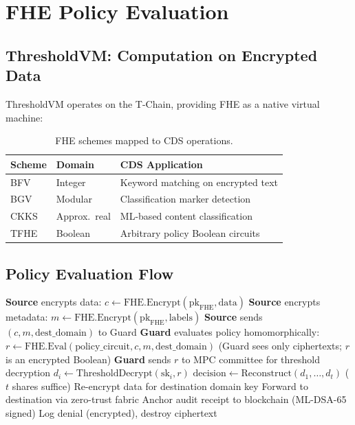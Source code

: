 \documentclass[11pt,letterpaper]{article}
\begin{document}
\section{FHE Policy Evaluation}

\subsection{ThresholdVM: Computation on Encrypted Data}

ThresholdVM operates on the T-Chain, providing FHE as a native virtual machine:

\begin{table}[H]
\centering
\begin{tabular}{@{}llp{4.5cm}@{}}
\toprule
\textbf{Scheme} & \textbf{Domain} & \textbf{CDS Application} \\
\midrule
BFV & Integer & Keyword matching on encrypted text \\
BGV & Modular & Classification marker detection \\
CKKS & Approx.\ real & ML-based content classification \\
TFHE & Boolean & Arbitrary policy Boolean circuits \\
\bottomrule
\end{tabular}
\caption{FHE schemes mapped to CDS operations.}
\label{tab:fhe-cds}
\end{table}

\subsection{Policy Evaluation Flow}

\begin{algorithm}[H]
\caption{FHE Cross-Domain Policy Evaluation}
\begin{algorithmic}[1]
\State \textbf{Source} encrypts data: $c \gets \text{FHE.Encrypt}(\text{pk}_{\text{FHE}}, \text{data})$
\State \textbf{Source} encrypts metadata: $m \gets \text{FHE.Encrypt}(\text{pk}_{\text{FHE}}, \text{labels})$
\State \textbf{Source} sends $(c, m, \text{dest\_domain})$ to Guard
\Statex
\State \textbf{Guard} evaluates policy homomorphically:
\State \quad $r \gets \text{FHE.Eval}(\text{policy\_circuit}, c, m, \text{dest\_domain})$
\State \quad (Guard sees only ciphertexts; $r$ is an encrypted Boolean)
\Statex
\State \textbf{Guard} sends $r$ to MPC committee for threshold decryption
  \State $d_i \gets \text{ThresholdDecrypt}(\text{sk}_i, r)$
\EndFor
\State $\text{decision} \gets \text{Reconstruct}(d_1, \ldots, d_t)$ \quad ($t$ shares suffice)
\Statex
{}
  \State Re-encrypt data for destination domain key
  \State Forward to destination via zero-trust fabric
  \State Anchor audit receipt to blockchain (ML-DSA-65 signed)
\Else
  \State Log denial (encrypted), destroy ciphertext
\EndIf
\end{algorithmic}
\end{algorithm}
\end{document}
